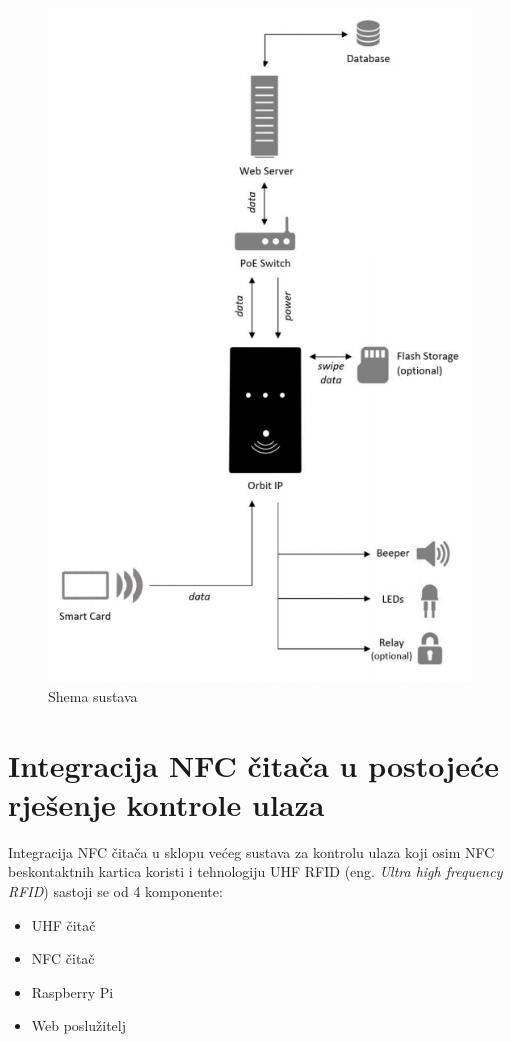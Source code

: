 \documentclass[times, utf8, zavrsni]{fer}
\begin{document}
\begin{figure}[H]
\includegraphics[scale=0.5]{arhitektura.png}
\centering
\caption{Shema sustava}
\centering
\end{figure}

\section{Integracija NFC čitača u postojeće rješenje kontrole ulaza}
Integracija NFC čitača u sklopu većeg sustava za kontrolu ulaza koji osim NFC beskontaktnih kartica koristi i tehnologiju UHF RFID (eng. \textit{Ultra high frequency RFID}) sastoji se od 4 komponente:
\begin{itemize}
\item UHF čitač
\item NFC čitač
\item Raspberry Pi
\item Web poslužitelj
\end{itemize}
\end{document}
